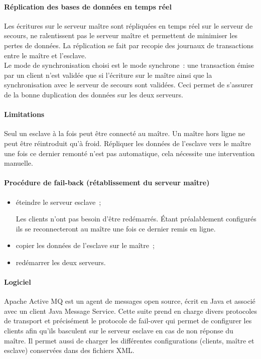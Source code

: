 \paragraph{Réplication des bases de données en temps réel}
Les écritures sur le serveur maître sont répliquées en temps réel sur le serveur de secours, ne ralentissent pas le serveur maître et permettent de minimiser les pertes de données.
La réplication se fait par recopie des journaux de transactions entre le maître et l'esclave.
\\
Le mode de synchronisation choisi est le mode synchrone~: une transaction émise par un client n'est validée que si l'écriture sur le maître ainsi que la synchronisation avec le serveur de secours sont validées.
Ceci permet de s'assurer de la bonne duplication des données sur les deux serveurs. 

\paragraph{Limitations}
Seul un esclave à la fois peut être connecté au maître.
Un maître hors ligne ne peut être réintroduit qu'à froid.
Répliquer les données de l'esclave vers le maître une fois ce dernier remonté n'est pas automatique, cela nécessite une intervention manuelle.

\paragraph{Procédure de fail-back (rétablissement du serveur maître)}
\begin{itemize}
	\item éteindre le serveur esclave~;
	\begin{notation}
		Les clients n'ont pas besoin d'être redémarrés.
		Étant préalablement configurés ils se reconnecteront au maître une fois ce dernier remis en ligne.
	\end{notation}
	\item copier les données de l'esclave sur le maître~;
	\item redémarrer les deux serveurs.
\end{itemize}

\paragraph{Logiciel}
Apache Active MQ est un agent de messages open source, écrit en Java et associé avec un client Java Message Service.
Cette suite prend en charge divers protocoles de transport et précisément le protocole de fail-over qui permet de configurer les clients afin qu'ils basculent sur le serveur esclave en cas de non réponse du maître. 
Il permet aussi de charger les différentes configurations (clients, maître et esclave) conservées dans des fichiers XML. 

